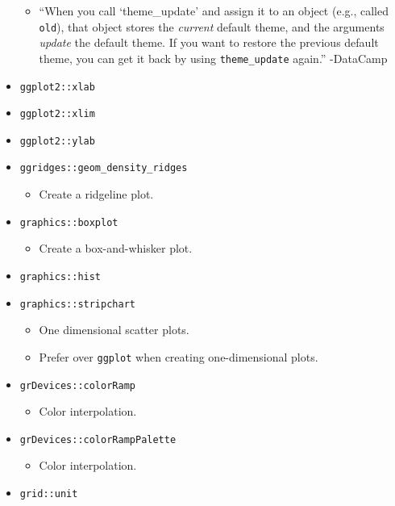 \documentclass[
]{book}
\providecommand{\tightlist}{%
  \setlength{\itemsep}{0pt}\setlength{\parskip}{0pt}}
\begin{document}
\begin{itemize}
  \begin{itemize}
  \tightlist
  \item
    ``When you call `theme\_update' and assign it to an object (e.g., called \texttt{old}), that object stores the \emph{current} default theme, and the arguments \emph{update} the default theme. If you want to restore the previous default theme, you can get it back by using \texttt{theme\_update} again.'' -DataCamp
  \end{itemize}
\item
  \texttt{ggplot2::xlab}
\item
  \texttt{ggplot2::xlim}
\item
  \texttt{ggplot2::ylab}
\item
  \texttt{ggridges::geom\_density\_ridges}

  \begin{itemize}
  \tightlist
  \item
    Create a ridgeline plot.
  \end{itemize}
\item
  \texttt{graphics::boxplot}

  \begin{itemize}
  \tightlist
  \item
    Create a box-and-whisker plot.
  \end{itemize}
\item
  \texttt{graphics::hist}
\item
  \texttt{graphics::stripchart}

  \begin{itemize}
  \tightlist
  \item
    One dimensional scatter plots.
  \item
    Prefer over \texttt{ggplot} when creating one-dimensional plots.
  \end{itemize}
\item
  \texttt{grDevices::colorRamp}

  \begin{itemize}
  \tightlist
  \item
    Color interpolation.
  \end{itemize}
\item
  \texttt{grDevices::colorRampPalette}

  \begin{itemize}
  \tightlist
  \item
    Color interpolation.
  \end{itemize}
\item
  \texttt{grid::unit}


\end{itemize}
\end{document}
